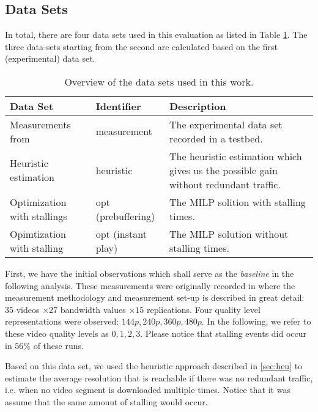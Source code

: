 
\subsection{Data Sets}

In total, there are four data sets used in this evaluation as listed in Table \ref{tab:datasets}. The three data-sets starting from the second are calculated based on the first (experimental) data set.
\begin{table}
\caption{Overview of the data sets used in this work.}
\label{tab:datasets}
\centering
\begin{tabular}{p{2cm}p{2.3cm}p{3.2cm}}
\toprule
Data Set & Identifier & Description \\ 
\midrule 
Measurements from \cite{sieber16sacrificing} & measurement & The experimental data set recorded in a testbed. \\ 
\addlinespace
Heuristic estimation & heuristic & The heuristic estimation which gives us the possible gain without redundant traffic. \\ 
\addlinespace
Optimization with stallings & opt (prebuffering) & The MILP solition with stalling times. \\ 
\addlinespace
Opimtization with stalling & opt (instant play) & The MILP solution without stalling times. \\ 
\bottomrule
\end{tabular} 
\end{table}

First, we have the initial observations which shall serve as the \textit{baseline} in the following analysis. These measurements were originally recorded in \cite{sieber16sacrificing} where the measurement methodology and measurement set-up is described in great detail: $35$ videos $\times 27$ bandwidth values $\times 15$ replications. Four quality level representations were observed: $144p, 240p, 360p, 480p$. In the following, we refer to these video quality levels as $0,1,2,3$. Please notice that stalling events did occur in $56\%$ of these runs.

Based on this data set, we used the heuristic approach described in \ref{sec:heu} to estimate the average resolution that is reachable if there was no redundant traffic, i.e. when no video segment is downloaded multiple times. Notice that it was assume that the same amount of stalling would occur.

